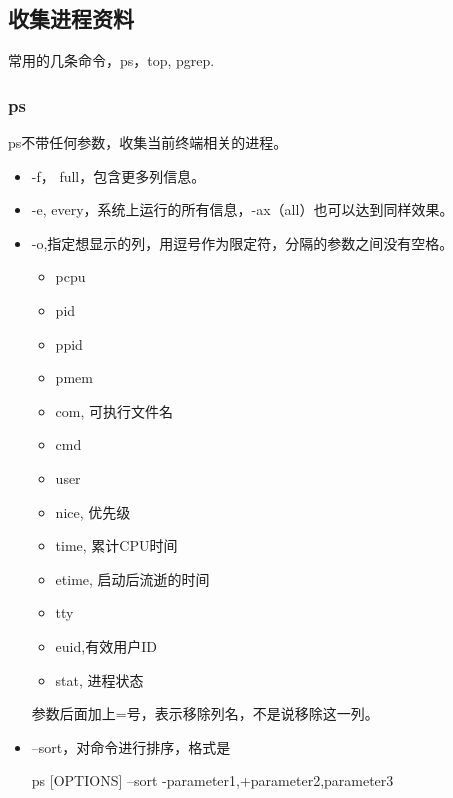 \subsection{收集进程资料}



常用的几条命令，ps，top, pgrep.

\subsubsection{ps}

ps不带任何参数，收集当前终端相关的进程。

\begin{itemize}

\item -f， full，包含更多列信息。

\item -e, every，系统上运行的所有信息，-ax（all）也可以达到同样效果。


\item -o,指定想显示的列，用逗号作为限定符，分隔的参数之间没有空格。

\begin{itemize}
\item pcpu
\item pid
\item ppid
\item pmem
\item com, 可执行文件名
\item cmd
\item user
\item nice, 优先级
\item time, 累计CPU时间
\item etime, 启动后流逝的时间
\item tty
\item euid,有效用户ID
\item stat, 进程状态
\end{itemize}

参数后面加上=号，表示移除列名，不是说移除这一列。





\item --sort，对命令进行排序，格式是

\begin{Bash}
ps [OPTIONS] --sort -parameter1,+parameter2,parameter3
\end{Bash}



\end{itemize}
